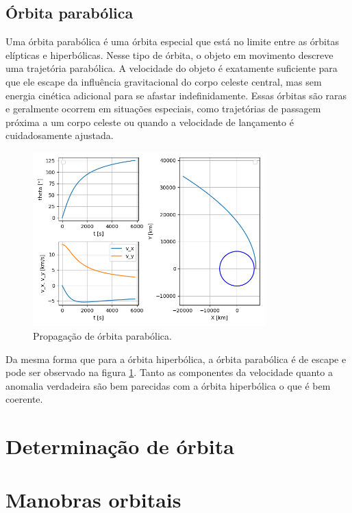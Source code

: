 \subsection{Órbita parabólica}

Uma órbita parabólica é uma órbita especial que está no limite entre as órbitas elípticas e hiperbólicas. Nesse tipo de órbita, o objeto em movimento descreve uma trajetória parabólica. A velocidade do objeto é exatamente suficiente para que ele escape da influência gravitacional do corpo celeste central, mas sem energia cinética adicional para se afastar indefinidamente. Essas órbitas são raras e geralmente ocorrem em situações especiais, como trajetórias de passagem próxima a um corpo celeste ou quando a velocidade de lançamento é cuidadosamente ajustada.

\begin{figure}[H]
\centering
\caption{Propagação de órbita parabólica.}
\label{fig: Resultado - Propagação de órbita parabólica}
\includegraphics[width=0.8\textwidth]{figuras/Resultados/aula6_parabolica.png}
\end{figure}

Da mesma forma que para a órbita hiperbólica, a órbita parabólica é de escape e pode ser observado na figura \ref{fig: Resultado - Propagação de órbita parabólica}. Tanto as componentes da velocidade quanto a anomalia verdadeira são bem parecidas com a órbita hiperbólica o que é bem coerente.

\section{Determinação de órbita}


\section{Manobras orbitais}

